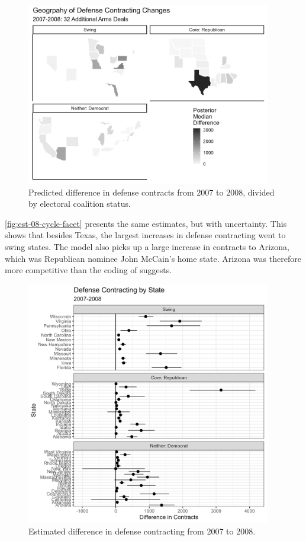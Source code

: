 \documentclass[12pt]{article}
\begin{document}
\begin{figure}[htpb]
	\centering
		\includegraphics[width=0.95\textwidth]{est-08-cycle.png}
	\caption{Predicted difference in defense contracts from 2007 to 2008, divided by electoral coalition status.}
	\label{fig:est-08-cycle}
\end{figure}


\autoref{fig:est-08-cycle-facet} presents the same estimates, but with uncertainty. 
This shows that besides Texas, the largest increases in defense contracting went to swing states. 
The model also picks up a large increase in contracts to Arizona, which was Republican nominee John McCain's home state.
Arizona was therefore more competitive than the coding of \citet{KrinerReeves2015} suggests. 


\begin{figure}[htpb]
	\centering
		\includegraphics[width=0.95\textwidth]{est-08-cycle-facet.png}
	\caption{Estimated difference in defense contracting from 2007 to 2008.}
	\label{fig:est-08-cycle-facet}
\end{figure}
\end{document}
